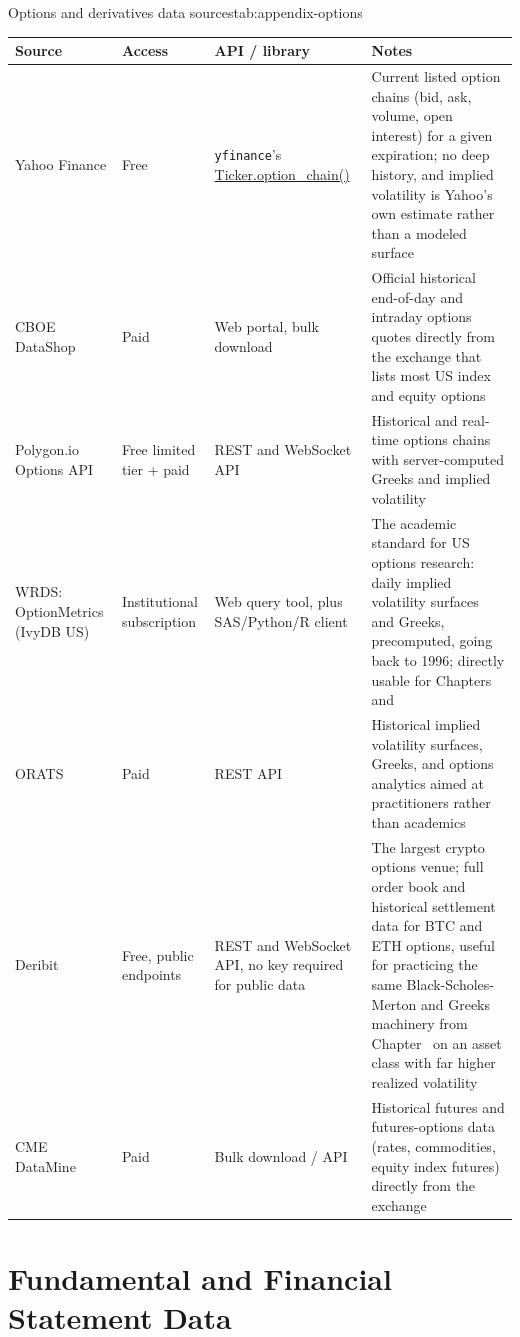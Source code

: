 \documentclass[../ai_in_finance]{subfiles}
\begin{document}
\begin{booktable}[htbp]{Options and derivatives data sources}{tab:appendix-options}
\begin{tabular}{L{3.0cm}L{2.4cm}L{3.6cm}L{4.0cm}}
\toprule
Source & Access & API / library & Notes \\
\midrule
Yahoo Finance & Free & \texttt{yfinance}'s \url{Ticker.option_chain()} & Current listed option chains (bid, ask, volume, open interest) for a given expiration; no deep history, and implied volatility is Yahoo's own estimate rather than a modeled surface \\
CBOE DataShop & Paid & Web portal, bulk download & Official historical end-of-day and intraday options quotes directly from the exchange that lists most US index and equity options \\
Polygon.io Options API & Free limited tier + paid & REST and WebSocket API & Historical and real-time options chains with server-computed Greeks and implied volatility \\
WRDS: OptionMetrics (IvyDB US) & Institutional subscription & Web query tool, plus SAS/Python/R client & The academic standard for US options research: daily implied volatility surfaces and Greeks, precomputed, going back to 1996; directly usable for Chapters~ and~ \\
ORATS & Paid & REST API & Historical implied volatility surfaces, Greeks, and options analytics aimed at practitioners rather than academics \\
Deribit & Free, public endpoints & REST and WebSocket API, no key required for public data & The largest crypto options venue; full order book and historical settlement data for BTC and ETH options, useful for practicing the same Black-Scholes-Merton and Greeks machinery from Chapter~ on an asset class with far higher realized volatility \\
CME DataMine & Paid & Bulk download / API & Historical futures and futures-options data (rates, commodities, equity index futures) directly from the exchange \\
\bottomrule
\end{tabular}
\end{booktable}

\section{Fundamental and Financial Statement Data}
\end{document}
